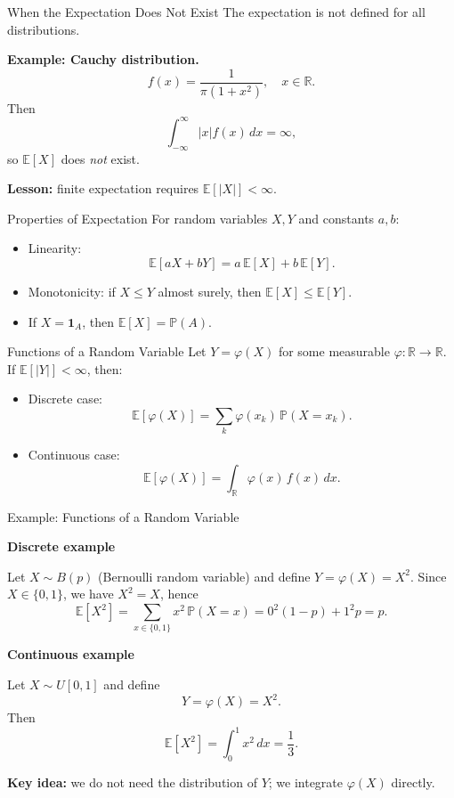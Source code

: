 \documentclass[aspectratio=169]{beamer}
\begin{document}
\begin{frame}{When the Expectation Does Not Exist}
The expectation is not defined for all distributions.

\medskip

\textbf{Example: Cauchy distribution.}
\[
f(x)=\frac{1}{\pi(1+x^2)},\quad x\in\mathbb{R}.
\]
Then
\[
\int_{-\infty}^{\infty} |x| f(x)\,dx = \infty,
\]
so \(\mathbb{E}[X]\) does \emph{not} exist.

\medskip

\textbf{Lesson:} finite expectation requires \(\mathbb{E}[|X|]<\infty\).

\end{frame}

\begin{frame}{Properties of Expectation}
For random variables \(X,Y\) and constants \(a,b\):\pause
\begin{itemize}
  \item Linearity:
    \[
      \mathbb{E}[aX + bY] = a\,\mathbb{E}[X] + b\,\mathbb{E}[Y].
    \]\pause
  \item Monotonicity: if \(X \le Y\) almost surely, then
    \(\mathbb{E}[X] \le \mathbb{E}[Y]\).\pause
  \item If \(X = \mathbf{1}_A\), then \(\mathbb{E}[X] = \mathbb{P}(A)\).\pause
\end{itemize}
\end{frame}

\begin{frame}{Functions of a Random Variable}
Let \(Y = \varphi(X)\) for some measurable \(\varphi:\mathbb{R}\to\mathbb{R}\).
If \(\mathbb{E}[|Y|]<\infty\), then:\pause
\begin{itemize}
  \item Discrete case:
  \[
    \mathbb{E}[\varphi(X)] = \sum_k \varphi(x_k)\,\mathbb{P}(X=x_k).
  \]\pause
  \item Continuous case:
  \[
    \mathbb{E}[\varphi(X)] = \int_{\mathbb{R}} \varphi(x)\,f(x)\,dx.
  \]\pause
\end{itemize}
\end{frame}

\begin{frame}{Example: Functions of a Random Variable}

\textbf{Discrete example}

Let \(X\sim B(p)\) (Bernoulli random variable) and define
$
Y=\varphi(X)=X^2.
$
\pause
Since \(X\in\{0,1\}\), we have \(X^2=X\), hence
\[
\mathbb{E}[X^2]
= \sum_{x\in\{0,1\}} x^2\,\mathbb{P}(X=x)
= 0^2(1-p)+1^2p
= p.
\]
\pause
\medskip

\textbf{Continuous example}

Let \(X\sim U[0,1]\) and define
\[
Y=\varphi(X)=X^2.
\]
\pause
Then
\[
\mathbb{E}[X^2]
= \int_0^1 x^2\,dx
= \frac{1}{3}.
\]
\pause
\medskip

\textbf{Key idea:}  
we do not need the distribution of \(Y\); we integrate \(\varphi(X)\) directly.

\end{frame}
\end{document}
